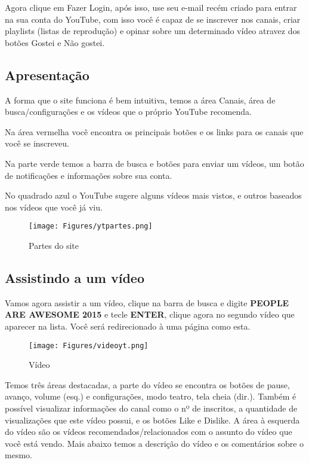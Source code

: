 \documentclass[hidelinks,12pt]{article}
\begin{document}
	
	Agora clique em Fazer Login, após isso, use seu e-mail recém criado para entrar na sua conta do YouTube, com isso você é capaz de se inscrever nos canais, criar playlists (listas de reprodução) e opinar sobre um determinado vídeo atravez dos botões Gostei e Não gostei.
	
	\newpage
	\subsection{Apresentação}
	A forma que o site funciona é bem intuitiva, temos a área Canais, área de busca/configurações e os vídeos que o próprio YouTube recomenda.
	
	Na área vermelha você encontra os principais botões e os links para os canais que você se inscreveu.
	
	Na parte verde temos a barra de busca e botões para enviar um vídeos, um botão de notificações e informações sobre sua conta.
	
	No quadrado azul o YouTube sugere alguns vídeos mais vistos, e outros baseados nos vídeos que você já viu.
	
	\begin{figure}[!h]
		\centering
		\texttt{[image: Figures/ytpartes.png]}
		\label{fig:config}
		\caption{Partes do site}
	\end{figure}

	\newpage
	\subsection{Assistindo a um vídeo}
	Vamos agora assistir a um vídeo, clique na barra de busca e digite \textbf{PEOPLE ARE AWESOME 2015} e tecle \textbf{ENTER}, clique agora no segundo vídeo que aparecer na lista.	Você será redirecionado à uma página como esta.
	\begin{figure}[!h]
		\centering
		\texttt{[image: Figures/videoyt.png]}
		\label{fig:config}
		\caption{Vídeo}
	\end{figure}
	
	Temos três áreas destacadas, a parte do vídeo se encontra os botões de pause, avanço, volume (esq.) e configurações, modo teatro, tela cheia (dir.).
	Também é possível visualizar informações do canal como o nº de inscritos, a quantidade de visualizações que este vídeo possui, e os botões Like e Dislike. A área à esquerda do vídeo são os vídeos recomendados/relacionados com o assunto do vídeo que você está vendo. Mais abaixo temos a descrição do vídeo e os comentários sobre o mesmo.
	
\end{document}
